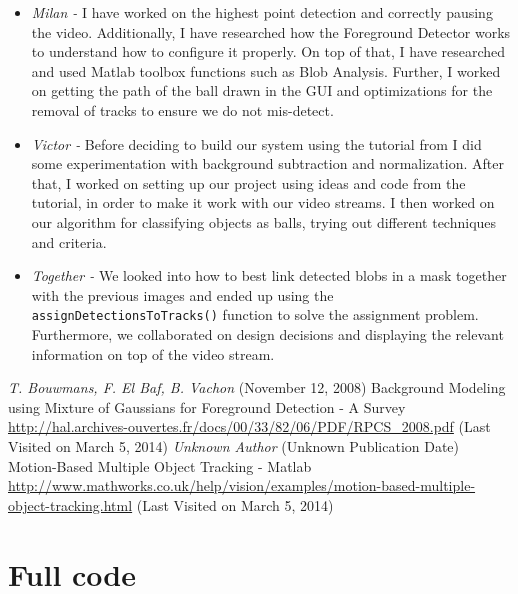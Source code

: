 \documentclass[10pt,a4paper]{article}
\begin{document}
\begin{multicols}{2}
\begin{itemize}
\item \textit{Milan - } I have worked on the highest point detection and correctly pausing the video. Additionally, I have researched how the Foreground Detector works to understand how to configure it properly. On top of that, I have researched and used Matlab toolbox functions such as Blob Analysis. Further, I worked on getting the path of the ball drawn in the GUI and optimizations for the removal of tracks to ensure we do not mis-detect.
\item \textit{Victor - } Before deciding to build our system using the tutorial from \cite{ES2} I did some experimentation with background subtraction and normalization. After that, I worked on setting up our project using ideas and code from the tutorial, in order to make it work with our video streams. I then worked on our algorithm for classifying objects as balls, trying out different techniques and criteria.
\item \textit{Together - } We looked into how to best link detected blobs in a mask together with the previous images and ended up using the \texttt{assignDetectionsToTracks()} function to solve the assignment problem. Furthermore, we collaborated on design decisions and displaying the relevant information on top of the video stream.
\end{itemize}

\end{multicols}


\begin{thebibliography}{10}
 \textit{T. Bouwmans, F. El Baf, B. Vachon} (November 12, 2008) Background Modeling using Mixture of Gaussians for Foreground Detection - A Survey \url{http://hal.archives-ouvertes.fr/docs/00/33/82/06/PDF/RPCS_2008.pdf} (Last Visited on March 5, 2014)
 \textit{Unknown Author} (Unknown Publication Date) Motion-Based Multiple Object Tracking - Matlab \url{http://www.mathworks.co.uk/help/vision/examples/motion-based-multiple-object-tracking.html} (Last Visited on March 5, 2014)
\end{thebibliography}


\section*{Full code}
\end{document}
